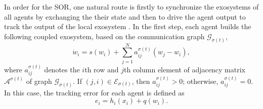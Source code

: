 \documentclass[onecolumn,a4paper,12pt]{article}
\numberwithin{equation}{section}
\begin{document}
In order for the SOR, one natural route is firstly to synchronize the exosystems of all agents by exchanging the their state and then to drive the agent output to track the output of the local exosystem \cite{WielandAU2011}\cite{SuTSMCB2012}. In the first step, each agent builds the following coupled exosystem, based on the communication graph $\mathcal{G}_{\sigma(t)}$,
\begin{equation} \label{II02}
  \dot{w}_i = s(w_i)+\sum_{j=1}^N a_{ij}^{\sigma(t)}(w_j-w_i),
\end{equation}
where $a_{ij}^{\sigma(t)}$ denotes the $i$th row and $j$th column element of adjacency matrix $\mathcal{A}^{\sigma(t)}$ of graph $\mathcal{G}_{\sigma(t)}$. If $(j,i)\in\mathcal{E}_{\sigma(t)}$, then $a^{\sigma(t)}_{ij}>0$; otherwise, $a^{\sigma(t)}_{ij}=0$. In this case,  the tracking error for each agent is defined as
\begin{equation}
  \label{II03}
  e_i = h_i(x_i)+q(w_i).
\end{equation}
\end{document}
